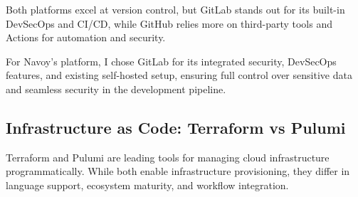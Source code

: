 Both platforms excel at version control, but GitLab stands out for its built-in DevSecOps and CI/CD, while GitHub relies more on third-party tools and Actions for automation and security.

For Navoy's platform, I chose GitLab for its integrated security, DevSecOps features, and existing self-hosted setup, ensuring full control over sensitive data and seamless security in the development pipeline.

\subsection{Infrastructure as Code: Terraform vs Pulumi}
Terraform and Pulumi are leading tools for managing cloud infrastructure programmatically. While both enable infrastructure provisioning, they differ in language support, ecosystem maturity, and workflow integration.

